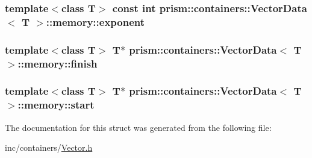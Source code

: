 \subsubsection[{\texorpdfstring{exponent}{exponent}}]{\setlength{\rightskip}{0pt plus 5cm}template$<$class T$>$ const int {\bf prism\+::containers\+::\+Vector\+Data}$<$ T $>$\+::memory\+::exponent}\hypertarget{structprism_1_1containers_1_1_vector_data_1_1memory_a454a3d72e1450abecdf70f747418f0d8}{}\label{structprism_1_1containers_1_1_vector_data_1_1memory_a454a3d72e1450abecdf70f747418f0d8}
\subsubsection[{\texorpdfstring{finish}{finish}}]{\setlength{\rightskip}{0pt plus 5cm}template$<$class T$>$ T$\ast$ {\bf prism\+::containers\+::\+Vector\+Data}$<$ T $>$\+::memory\+::finish}\hypertarget{structprism_1_1containers_1_1_vector_data_1_1memory_a96fc012185f1c540d036479500e8b922}{}\label{structprism_1_1containers_1_1_vector_data_1_1memory_a96fc012185f1c540d036479500e8b922}
\subsubsection[{\texorpdfstring{start}{start}}]{\setlength{\rightskip}{0pt plus 5cm}template$<$class T$>$ T$\ast$ {\bf prism\+::containers\+::\+Vector\+Data}$<$ T $>$\+::memory\+::start}\hypertarget{structprism_1_1containers_1_1_vector_data_1_1memory_af3f72d7433538e3fa6cd64e014901df8}{}\label{structprism_1_1containers_1_1_vector_data_1_1memory_af3f72d7433538e3fa6cd64e014901df8}


The documentation for this struct was generated from the following file\+:\begin{DoxyCompactItemize}
\item 
inc/containers/\hyperlink{_vector_8h}{Vector.\+h}\end{DoxyCompactItemize}
